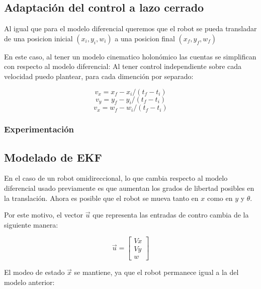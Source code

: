 
\subsection{Adaptación del control a lazo cerrado}

Al igual que para el modelo diferencial queremos que el robot se pueda transladar de una posicion inicial $(x_i,y_i,w_i)$ a una posicion final $(x_f,y_f,w_f)$


En este caso, al tener un modelo cinematico holonómico las cuentas se simplifican con respecto al modelo diferencial: Al tener control independiente sobre cada velocidad puedo plantear, para cada dimención por separado:

$$v_x = x_f - x_i / (t_f - t_i)$$
$$v_y = y_f - y_i / (t_f - t_i)$$
$$v_x = w_f - w_i / (t_f - t_i)$$

\subsubsection{Experimentación}


\subsection{Modelado de EKF}
En el caso de un robot omidireccional, lo que cambia respecto al modelo diferencial usado previamente es que aumentan los grados de libertad posibles en la translación. Ahora es posible que el robot se mueva tanto en $x$ como en $y$ y $\theta$.

Por este motivo, el vector $\overrightarrow{u}$ que representa las entradas de contro cambia de la siguiente manera:

$$\overrightarrow{u} = \begin{bmatrix}
         Vx \\
         Vy \\
         w 
        \end{bmatrix}$$


El modeo de estado $\overrightarrow{x}$ se mantiene, ya que el robot permanece igual a la del modelo anterior:

